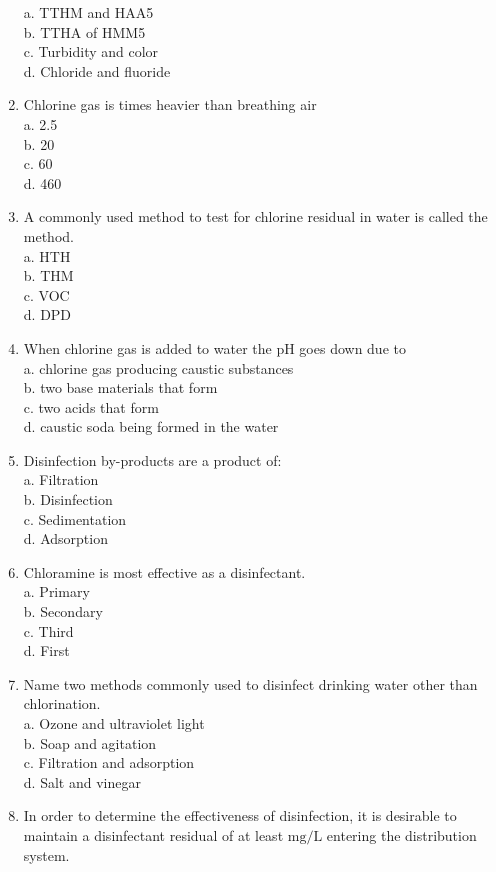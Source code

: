 \begin{enumerate}[1.]
a. TTHM and HAA5\\
b. TTHA of HMM5\\
c. Turbidity and color\\
d. Chloride and fluoride\\
\item Chlorine gas is times heavier than breathing air\\
a. 2.5\\
b. 20\\
c. 60\\
d. 460\\
\item A commonly used method to test for chlorine residual in water is called the method.\\
a. HTH\\
b. THM\\
c. VOC\\
d. DPD\\
\item When chlorine gas is added to water the pH goes down due to\\
a. chlorine gas producing caustic substances\\
b. two base materials that form\\
c. two acids that form\\
d. caustic soda being formed in the water\\
\item Disinfection by-products are a product of:\\
a. Filtration\\
b. Disinfection\\
c. Sedimentation\\
d. Adsorption\\
\item Chloramine is most effective as a disinfectant.\\
a. Primary\\
b. Secondary\\
c. Third\\
d. First\\
\item Name two methods commonly used to disinfect drinking water other than chlorination.\\
a. Ozone and ultraviolet light\\
b. Soap and agitation\\
c. Filtration and adsorption\\
d. Salt and vinegar\\
\item In order to determine the effectiveness of disinfection, it is desirable to maintain a disinfectant residual of at least $\mathrm{mg} / \mathrm{L}$ entering the distribution system.\\

\end{enumerate}

